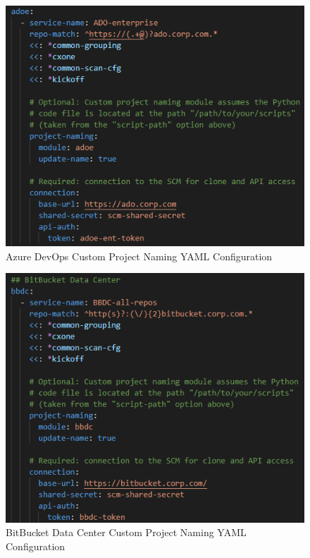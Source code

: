 \begin{figure}[h]
    \includegraphics[width=\textwidth]{graphics/naming_example_adoe.png}
    \caption{Azure DevOps Custom Project Naming YAML Configuration}
    \label{fig:naming-yaml-adoe}
\end{figure}


\begin{figure}[h]
    \includegraphics[width=\textwidth]{graphics/naming_example_bbdc.png}
    \caption{BitBucket Data Center Custom Project Naming YAML Configuration}
    \label{fig:naming-yaml-bbdc}
\end{figure}

